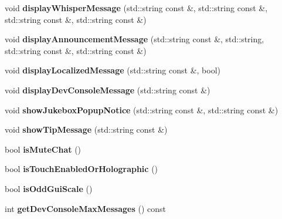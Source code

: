 \begin{DoxyCompactItemize}
\item 
\mbox{\label{struct_gui_data_a97a59890bf51ef37c37e46318c88adf5}} 
void {\bfseries display\+Whisper\+Message} (std\+::string const \&, std\+::string const \&, std\+::string const \&, std\+::string const \&)
\item 
\mbox{\label{struct_gui_data_a256483490104e884408d73de7b047b60}} 
void {\bfseries display\+Announcement\+Message} (std\+::string const \&, std\+::string, std\+::string const \&, std\+::string const \&)
\item 
\mbox{\label{struct_gui_data_a7baad3345636d0523025d5ca8b3e79ae}} 
void {\bfseries display\+Localized\+Message} (std\+::string const \&, bool)
\item 
\mbox{\label{struct_gui_data_af49039b5ea28caefc7d48f12dd67441e}} 
void {\bfseries display\+Dev\+Console\+Message} (std\+::string const \&)
\item 
\mbox{\label{struct_gui_data_ae56ae5d337965ca299827ca3a424d023}} 
void {\bfseries show\+Jukebox\+Popup\+Notice} (std\+::string const \&, std\+::string const \&)
\item 
\mbox{\label{struct_gui_data_a1daef056d063863cfb77e4df9f037947}} 
void {\bfseries show\+Tip\+Message} (std\+::string const \&)
\item 
\mbox{\label{struct_gui_data_aa35ef147f5655eeefba5296dd5597235}} 
bool {\bfseries is\+Mute\+Chat} ()
\item 
\mbox{\label{struct_gui_data_a87a32ff8ebd000fca5aa7995b9721d1d}} 
bool {\bfseries is\+Touch\+Enabled\+Or\+Holographic} ()
\item 
\mbox{\label{struct_gui_data_a9c20f24caeb026b2de1ead06f02c1858}} 
bool {\bfseries is\+Odd\+Gui\+Scale} ()
\item 
\mbox{\label{struct_gui_data_a9fac39b0a15dcc9e2d54d1bf1e9bf6b9}} 
int {\bfseries get\+Dev\+Console\+Max\+Messages} () const
\item 
\mbox{\label{struct_gui_data_a7c16d4813ee51754c97eba09beff7a61}} 

\end{DoxyCompactItemize}
